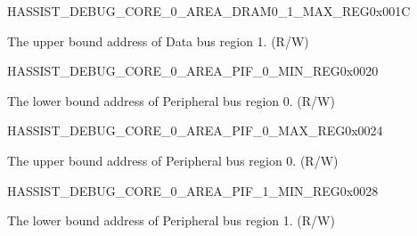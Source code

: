 \begin{register}{H}{ASSIST\_DEBUG\_CORE\_0\_AREA\_DRAM0\_1\_MAX\_REG}{0x001C}\label{regdesc:ASSISTDEBUGCORE0AREADRAM01MAXREG}
%
\regnewline%
\begin{regdesc}\begin{reglist}
\label{fielddesc:ASSISTDEBUGCORE0AREADRAM01MAX}\item [ASSIST\_DEBUG\_CORE\_0\_AREA\_DRAM0\_1\_MAX] The upper bound address of Data bus region 1. (R/W)
\end{reglist}\end{regdesc}
\end{register}


\begin{register}{H}{ASSIST\_DEBUG\_CORE\_0\_AREA\_PIF\_0\_MIN\_REG}{0x0020}\label{regdesc:ASSISTDEBUGCORE0AREAPIF0MINREG}
%
\regnewline%
\begin{regdesc}\begin{reglist}
\label{fielddesc:ASSISTDEBUGCORE0AREAPIF0MIN}\item [ASSIST\_DEBUG\_CORE\_0\_AREA\_PIF\_0\_MIN] The lower bound address of Peripheral bus region 0. (R/W)
\end{reglist}\end{regdesc}
\end{register}


\begin{register}{H}{ASSIST\_DEBUG\_CORE\_0\_AREA\_PIF\_0\_MAX\_REG}{0x0024}\label{regdesc:ASSISTDEBUGCORE0AREAPIF0MAXREG}
%
\regnewline%
\begin{regdesc}\begin{reglist}
\label{fielddesc:ASSISTDEBUGCORE0AREAPIF0MAX}\item [ASSIST\_DEBUG\_CORE\_0\_AREA\_PIF\_0\_MAX] The upper bound address of Peripheral bus region 0. (R/W)
\end{reglist}\end{regdesc}
\end{register}


\begin{register}{H}{ASSIST\_DEBUG\_CORE\_0\_AREA\_PIF\_1\_MIN\_REG}{0x0028}\label{regdesc:ASSISTDEBUGCORE0AREAPIF1MINREG}
%
\regnewline%
\begin{regdesc}\begin{reglist}
\label{fielddesc:ASSISTDEBUGCORE0AREAPIF1MIN}\item [ASSIST\_DEBUG\_CORE\_0\_AREA\_PIF\_1\_MIN] The lower bound address of Peripheral bus region 1. (R/W)
\end{reglist}\end{regdesc}
\end{register}


